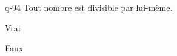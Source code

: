 \begin{truefalse}{q-94}
Tout nombre est divisible par lui-même.
\item* Vrai
\item Faux
\end{truefalse}

